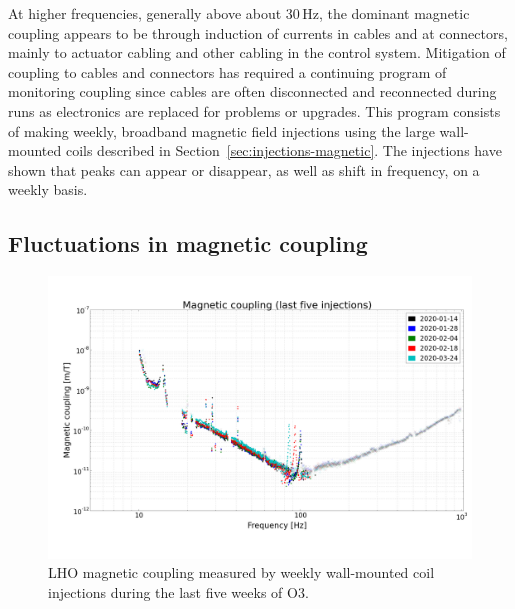 At higher frequencies, generally above about 30\,Hz, the dominant magnetic coupling appears to be through induction of currents in cables and at connectors, mainly to actuator cabling and other cabling in the control system.
Mitigation of coupling to cables and connectors has required a continuing program of monitoring coupling since cables are often disconnected and reconnected during runs as electronics are replaced for problems or upgrades.
This program consists of making weekly, broadband magnetic field injections using the large wall-mounted coils described in Section~\ref{sec:injections-magnetic}.
The injections have shown that peaks can appear or disappear, as well as shift in frequency, on a weekly basis.

\subsection{Fluctuations in magnetic coupling}\label{sec:noise-mag-weekly}

\begin{figure}[h]
	\centering
	\includegraphics[width=\textwidth]{figures/noise-mag-weekly-cf.png}
	\caption{
		LHO magnetic coupling measured by weekly wall-mounted coil injections during the last five weeks of O3.}
	\label{fig:noise-mag-weekly-cf}
\end{figure}

